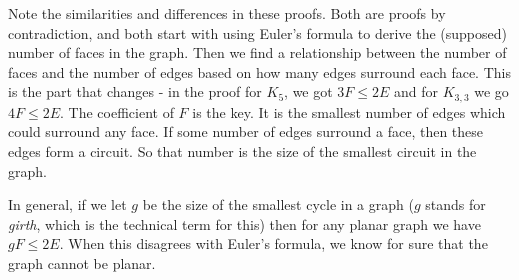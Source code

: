 \documentclass[12pt]{article}
\begin{document}
Note the similarities and differences in these proofs.  Both are proofs by contradiction, and both start with using Euler's formula to derive the (supposed) number of faces in the graph.  Then we find a relationship between the number of faces and the number of edges based on how many edges surround each face.  This is the part that changes - in the proof for $K_5$, we got $3F \le 2E$ and for $K_{3,3}$ we go $4F \le 2E$.  The coefficient of $F$ is the key.  It is the smallest number of edges which could surround any face.  If some number of edges surround a face, then these edges form a circuit.  So that number is the size of the smallest circuit in the graph.

In general, if we let $g$ be the size of the smallest cycle in a graph ($g$ stands for {\em girth}, which is the technical term for this) then for any planar graph we have $gF \le 2E$.  When this disagrees with Euler's formula, we know for sure that the graph cannot be planar.
\end{document}
